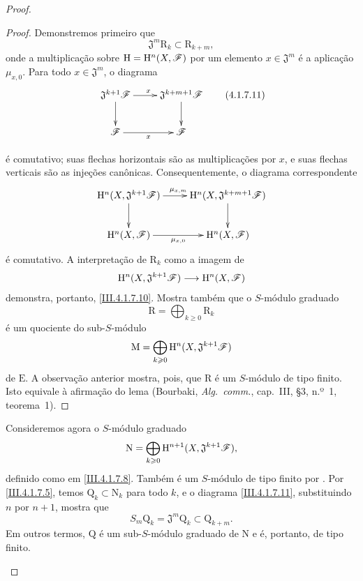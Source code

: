 \begin{proof}
\begin{proof}
Demonstremos primeiro que
\[
  \mathfrak{J}^m\mathrm{R}_k
  \subset
  \mathrm{R}_{k+m},
  \tag{4.1.7.10}
  \label{III.4.1.7.10}
\]
onde a multiplicação sobre
$\mathrm{H}=\mathrm{H}^n(X,\mathscr{F})$ por um elemento
$x\in\mathfrak{J}^m$ é a aplicação $\mu_{x,0}$.
Para todo $x\in\mathfrak{J}^m$, o diagrama
\[
  \xymatrix{
    \mathfrak{J}^{k+1}\sh{F}
      \ar[r]^{x}\ar[d]
    &
    \mathfrak{J}^{k+m+1}\sh{F}
      \ar[d]
    \\
    \sh{F}
      \ar[r]_{x}
    &
    \sh{F}
  }
  \tag{4.1.7.11}
  \label{III.4.1.7.11}
\]


é comutativo; suas flechas horizontais são as multiplicações por
$x$, e suas flechas verticais são as injeções canônicas.
Consequentemente, o diagrama correspondente
\[
  \xymatrix{
    \HH^n(X,\mathfrak{J}^{k+1}\sh{F})
      \ar[r]^{\mu_{x,m}}\ar[d]
    &
    \HH^n(X,\mathfrak{J}^{k+m+1}\sh{F})
      \ar[d]
    \\
    \HH^n(X,\sh{F})
      \ar[r]_{\mu_{x,0}}
    &
    \HH^n(X,\sh{F})
  }
\]
é comutativo.
A interpretação de $\mathrm{R}_k$ como a imagem de
\[
  \mathrm{H}^n(X,\mathfrak{J}^{k+1}\mathscr{F})
  \longrightarrow
  \mathrm{H}^n(X,\mathscr{F})
\]
demonstra, portanto, \eqref{III.4.1.7.10}.
Mostra também que o $S$-módulo graduado
\[
  \mathrm{R}=\bigoplus_{k\geq0}\mathrm{R}_k
\]
é um quociente do sub-$S$-módulo
\[
  \mathrm{M}
  =
  \bigoplus_{k\geqslant0}
  \mathrm{H}^n(X,\mathfrak{J}^{k+1}\mathscr{F})
\]
de $\mathrm{E}$.
A observação anterior mostra, pois, que $\mathrm{R}$ é um
$S$-módulo de tipo finito.
Isto equivale à afirmação do lema
(Bourbaki, \emph{Alg.\ comm.}, cap.~III, \S3, n.º~1, teorema~1).
\end{proof}

\begin{env}[4.1.7.12]
\label{III.4.1.7.12}
Consideremos agora o $S$-módulo graduado
\[
  \mathrm{N}
  =
  \bigoplus_{k\geqslant0}
  \mathrm{H}^{n+1}(X,\mathfrak{J}^{k+1}\mathscr{F}),
\]
definido como em \eqref{III.4.1.7.8}.
Também é um $S$-módulo de tipo finito por .
Por \eqref{III.4.1.7.5}, temos
$\mathrm{Q}_k\subset\mathrm{N}_k$ para todo $k$, e o diagrama
\eqref{III.4.1.7.11}, substituindo $n$ por $n+1$, mostra que
\[
  S_m\mathrm{Q}_k
  =
  \mathfrak{J}^m\mathrm{Q}_k
  \subset
  \mathrm{Q}_{k+m}.
\]
Em outros termos, $\mathrm{Q}$ é um sub-$S$-módulo graduado de
$\mathrm{N}$ e é, portanto, de tipo finito.
\end{env}


\end{proof}
